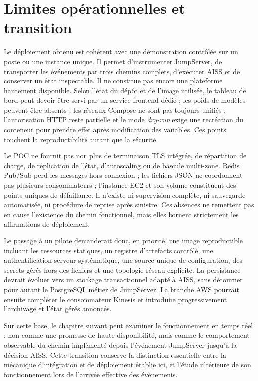 \documentclass[11pt,a4paper,oneside]{report}
\theoremstyle{definition}
\theoremstyle{plain}
\begin{document}
\section{Limites opérationnelles et transition}

Le déploiement obtenu est cohérent avec une démonstration contrôlée sur un
poste ou une instance unique. Il permet d'instrumenter JumpServer, de
transporter les événements par trois chemins complets, d'exécuter AISS et de
conserver un état inspectable. Il ne constitue pas encore une plateforme
hautement disponible. Selon l'état du dépôt et de l'image utilisée, le
tableau de bord peut devoir être servi par un service frontend dédié ; les
poids de modèles peuvent être absents ; les réseaux Compose ne sont pas
toujours unifiés ; l'autorisation HTTP reste partielle et le mode
\emph{dry-run} exige une recréation du conteneur pour prendre effet après
modification des variables. Ces points touchent la reproductibilité autant que
la sécurité.

Le POC ne fournit pas non plus de terminaison TLS intégrée, de répartition de
charge, de réplication de l'état, d'autoscaling ou de bascule
multi-zone. Redis Pub/Sub perd les messages hors connexion ; les fichiers
JSON ne coordonnent pas plusieurs consommateurs ; l'instance EC2 et son
volume constituent des points uniques de défaillance. Il n'existe ni
supervision complète, ni sauvegarde automatisée, ni procédure de reprise
après sinistre. Ces absences ne remettent pas en cause l'existence du chemin
fonctionnel, mais elles bornent strictement les affirmations de déploiement.

Le passage à un pilote demanderait donc, en priorité, une image reproductible
incluant les ressources statiques, un registre d'artefacts contrôlé, une
authentification serveur systématique, une source unique de configuration,
des secrets gérés hors des fichiers et une topologie réseau explicite. La
persistance devrait évoluer vers un stockage transactionnel adapté à AISS,
sans détourner pour autant le PostgreSQL métier de JumpServer. La branche AWS
pourrait ensuite compléter le consommateur Kinesis et introduire
progressivement l'archivage et l'état gérés annoncés.

Sur cette base, le chapitre suivant peut examiner le fonctionnement en temps
réel : non comme une promesse de haute disponibilité, mais comme le
comportement observable du chemin implémenté depuis l'événement JumpServer
jusqu'à la décision AISS. Cette transition conserve la distinction essentielle
entre la mécanique d'intégration et de déploiement établie ici, et l'étude
ultérieure de son fonctionnement lors de l'arrivée effective des événements.
\end{document}
